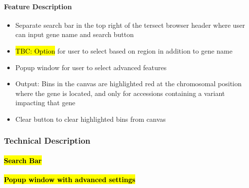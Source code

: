 \documentclass[12pt]{article}
\begin{document}
\paragraph{Feature Description}
\begin{itemize}
    \item Separate search bar in the top right of the tersect browser header where user can input gene name and search button 
    \item \hl{TBC: Option} for user to select based on region in addition to gene name 
    \item Popup window for user to select advanced features 
    \item Output: Bins in the canvas are highlighted red at the chromosomal position where the gene is located, and only for accessions containing a variant impacting that gene 
    \item Clear button to clear highlighted bins from canvas 
\end{itemize}
\subsubsection{Technical Description}
\paragraph{\hl{Search Bar}}
\paragraph{\hl{Popup window with advanced settings }}
\end{document}
